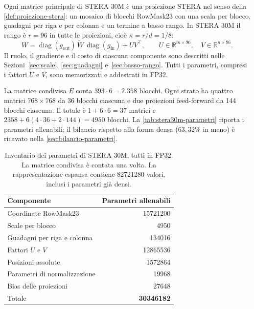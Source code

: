 Ogni matrice principale di STERA 30M è una proiezione STERA nel senso della \autoref{def:proiezione-stera}: un mosaico di blocchi RowMask23 con una scala per blocco, guadagni per riga e per colonna e un termine a basso rango. In STERA 30M il rango è $r=96$ in tutte le proiezioni, cioè $\kappa=r/d=1/8$:
\begin{equation}
 W = \operatorname{diag}(g_{\mathrm{out}})\,\widetilde W\,
     \operatorname{diag}(g_{\mathrm{in}}) + UV^\top,
 \qquad U \in \mathbb{R}^{m\times96},\quad V \in \mathbb{R}^{n\times96}.
 \label{eq:stera30m-peso}
\end{equation}
Il ruolo, il gradiente e il costo di ciascuna componente sono descritti nelle Sezioni~\ref{sec:scale}, \ref{sec:guadagni} e~\ref{sec:basso-rango}. Tutti i parametri, compresi i fattori $U$ e $V$, sono memorizzati e addestrati in FP32.

La matrice condivisa $E$ conta $393\cdot6=2.358$ blocchi. Ogni strato ha quattro matrici $768\times768$ da 36 blocchi ciascuna e due proiezioni feed-forward da 144 blocchi ciascuna. Il totale è $1+6\cdot6=37$ matrici e $2358+6(4\cdot36+2\cdot144)=\num{4950}$ blocchi. La \autoref{tab:stera30m-parametri} riporta i parametri allenabili; il bilancio rispetto alla forma densa ($63{,}32\%$ in meno) è ricavato nella \autoref{sec:bilancio-parametri}.

\begin{table}[htbp]
\centering
\small
\begin{tabular}{lr}
\toprule
Componente & Parametri allenabili \\
\midrule
Coordinate RowMask23 & \num{15721200} \\
Scale per blocco & \num{4950} \\
Guadagni per riga e colonna & \num{134016} \\
Fattori $U$ e $V$ & \num{12865536} \\
Posizioni assolute & \num{1572864} \\
Parametri di normalizzazione & \num{19968} \\
Bias delle proiezioni & \num{27648} \\
\midrule
Totale & \textbf{\num{30346182}} \\
\bottomrule
\end{tabular}
\caption{Inventario dei parametri di STERA 30M, tutti in FP32. La matrice condivisa è contata una volta. La rappresentazione espansa contiene \num{82721280} valori, inclusi i parametri già densi.}
\label{tab:stera30m-parametri}
\end{table}

